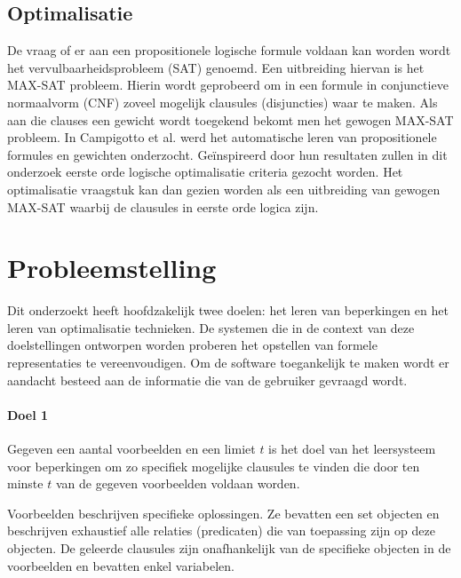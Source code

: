 \subsection{Optimalisatie}
De vraag of er aan een propositionele logische formule voldaan kan worden wordt het vervulbaarheidsprobleem (SAT) genoemd.
Een uitbreiding hiervan is het MAX-SAT probleem.
Hierin wordt geprobeerd om in een formule in conjunctieve normaalvorm (CNF) zoveel mogelijk clausules (disjuncties) waar te maken.
Als aan die clauses een gewicht wordt toegekend bekomt men het gewogen MAX-SAT probleem.
In Campigotto et al.\cite{campigotto2011active} werd het automatische leren van propositionele formules en gewichten onderzocht.
Ge\"inspireerd door hun resultaten zullen in dit onderzoek eerste orde logische optimalisatie criteria gezocht worden.
Het optimalisatie vraagstuk kan dan gezien worden als een uitbreiding van gewogen MAX-SAT waarbij de clausules in eerste orde logica zijn.


\section{Probleemstelling}
Dit onderzoekt heeft hoofdzakelijk twee doelen: het leren van beperkingen en het leren van optimalisatie technieken.
De systemen die in de context van deze doelstellingen ontworpen worden proberen het opstellen van formele representaties te vereenvoudigen.
Om de software toegankelijk te maken wordt er aandacht besteed aan de informatie die van de gebruiker gevraagd wordt.

\begin{framed}
  \noindent
  \begin{minipage}{\textwidth}
    \paragraph*{Doel 1}
    Gegeven een aantal voorbeelden en een limiet $t$ is het doel van het leersysteem voor beperkingen om zo specifiek mogelijke clausules te vinden die door ten minste $t$ van de gegeven voorbeelden voldaan worden.
  \end{minipage}
\end{framed}

Voorbeelden beschrijven specifieke oplossingen.
Ze bevatten een set objecten en beschrijven exhaustief alle relaties (predicaten) die van toepassing zijn op deze objecten.
De geleerde clausules zijn onafhankelijk van de specifieke objecten in de voorbeelden en bevatten enkel variabelen.

